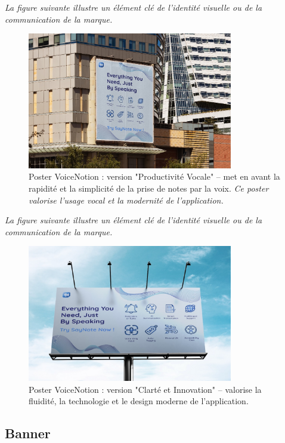 \noindent
\textit{La figure suivante illustre un élément clé de l'identité visuelle ou de la communication de la marque.}
\begin{figure}[H]
    \centering
    \includegraphics[width=0.8\textwidth]{docs/visual-indentity/pictures/poster2.jpg}
    \caption{Poster VoiceNotion : version "Productivité Vocale" – met en avant la rapidité et la simplicité de la prise de notes par la voix. \newline\textit{Ce poster valorise l'usage vocal et la modernité de l'application.}}
\end{figure}
\noindent
\textit{La figure suivante illustre un élément clé de l'identité visuelle ou de la communication de la marque.}
\begin{figure}[H]
    \centering
    \includegraphics[width=0.8\textwidth]{docs/visual-indentity/pictures/poster.jpg}
    \caption{Poster VoiceNotion : version "Clarté et Innovation" – valorise la fluidité, la technologie et le design moderne de l’application.}
\end{figure}

\subsection{Banner}
